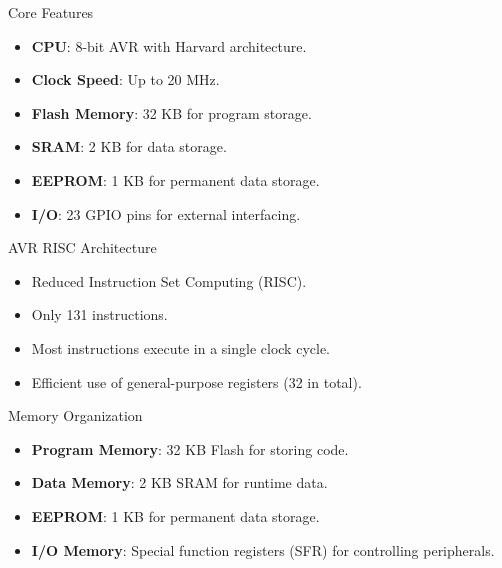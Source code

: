 \documentclass[aspectratio=169]{beamer}
\begin{document}
\begin{frame}{Core Features}
    \begin{itemize}
        \item <1-> \textbf{CPU}: 8-bit AVR with Harvard architecture.
        \item <2-> \textbf{Clock Speed}: Up to 20 MHz.
        \item <3-> \textbf{Flash Memory}: 32 KB for program storage.
        \item <4-> \textbf{SRAM}: 2 KB for data storage.
        \item <5-> \textbf{EEPROM}: 1 KB for permanent data storage.
        \item <6-> \textbf{I/O}: 23 GPIO pins for external interfacing.
    \end{itemize}
\end{frame}

\begin{frame}{AVR RISC Architecture}
    \begin{itemize}
        \item <1-> Reduced Instruction Set Computing (RISC).
        \item <2-> Only 131 instructions.
        \item <3-> Most instructions execute in a single clock cycle.
        \item <4-> Efficient use of general-purpose registers (32 in total).
    \end{itemize}
\end{frame}

\begin{frame}{Memory Organization}
    \begin{itemize}
        \item \textbf{Program Memory}: 32 KB Flash for storing code.
        \item \textbf{Data Memory}: 2 KB SRAM for runtime data.
        \item \textbf{EEPROM}: 1 KB for permanent data storage.
        \item \textbf{I/O Memory}: Special function registers (SFR) for controlling peripherals.
    \end{itemize}
\end{frame}
\end{document}
